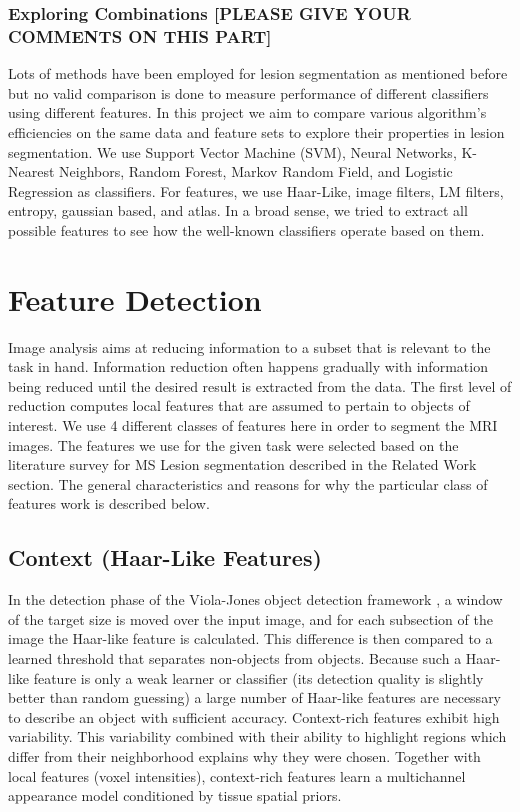 \documentclass{article} %
\begin{document}
\subsubsection{ Exploring Combinations [PLEASE GIVE YOUR COMMENTS ON THIS PART] }
Lots of methods have been employed for lesion segmentation as mentioned before but no valid comparison is done to measure performance of different classifiers using different features. In this project we aim to compare various algorithm's efficiencies on the same data and feature sets to explore their properties in  lesion segmentation. We use Support Vector Machine (SVM), Neural Networks, K-Nearest Neighbors, Random Forest, Markov Random Field, and Logistic Regression as classifiers. For features, we use Haar-Like, image filters, LM filters, entropy, gaussian based, and atlas. In a broad sense, we tried to extract all possible features to see how the well-known classifiers operate based on them.

\section{Feature Detection}
Image analysis aims at reducing information to a subset that is relevant to the task in hand. Information reduction often happens gradually with information being reduced until the desired result is extracted from the data. \cite{toennies2012guide} The first level of reduction computes local features that are assumed to pertain to objects of interest. We use 4 different classes of features here in order to segment the MRI images. The features we use for the given task were selected based on the literature survey for MS Lesion segmentation described in the Related Work section. The general characteristics and reasons for why the particular class of features work is described below.  

\subsection{Context (Haar-Like Features)}
In the detection phase of the Viola-Jones object detection framework \cite{Viola-Jones}, a window of the target size is moved over the input image, and for each subsection of the image the Haar-like feature is calculated. This difference is then compared to a learned threshold that separates non-objects from objects. Because such a Haar-like feature is only a weak learner or classifier (its detection quality is slightly better than random guessing) a large number of Haar-like features are necessary to describe an object with sufficient accuracy. Context-rich features exhibit high variability. This variability combined with their ability to highlight regions which differ from their neighborhood explains why they were chosen. Together with local features (voxel intensities), context-rich features learn a multichannel appearance model conditioned by tissue spatial priors.\cite{geremia2011spatial}
\end{document}
